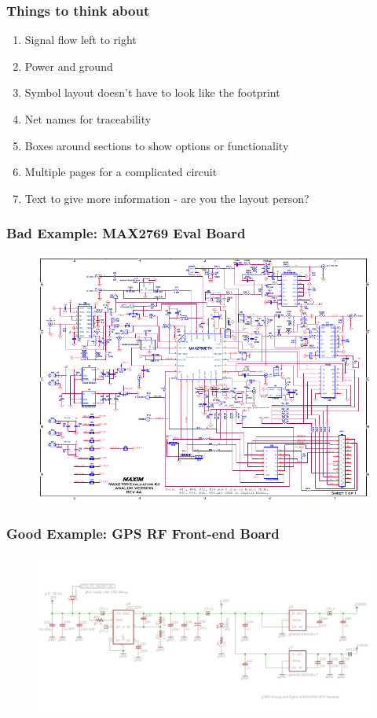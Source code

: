 \documentclass{beamer}
\begin{document}

\begin{frame}
\frametitle{Things to think about}
\begin{enumerate}
\item Signal flow left to right
\item Power and ground
\item Symbol layout doesn't have to look like the footprint
\item Net names for traceability
\item Boxes around sections to show options or functionality
\item Multiple pages for a complicated circuit
\item Text to give more information - are you the layout person?
\end{enumerate} 
\end{frame}


\begin{frame}
\frametitle{Bad Example: MAX2769 Eval Board}
\begin{figure}
\includegraphics[width=0.9\linewidth]{badschema.png}
\end{figure}
\end{frame}


\begin{frame}
\frametitle{Good Example: GPS RF Front-end Board}
\begin{figure}
\includegraphics[width=1\linewidth]{schflow.png}
\end{figure}
\end{frame}
\end{document}
